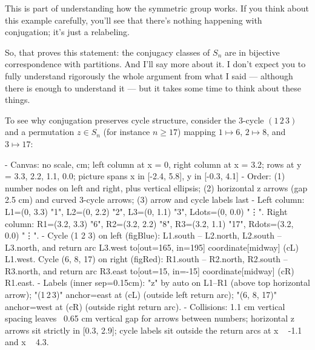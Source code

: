 \begin{speech}[01:21:37 - 01:23:51]
This is part of understanding how the symmetric group works. If you think about this example carefully, you'll see that there's nothing happening with conjugation; it's just a relabeling.

So, that proves this statement: the conjugacy classes of $S_n$ are in bijective correspondence with partitions. And I'll say more about it. I don't expect you to fully understand rigorously the whole argument from what I said --- although there is enough to understand it --- but it takes some time to think about these things.
\end{speech}

\begin{content}
To see why conjugation preserves cycle structure, consider the $3$-cycle $(1\,2\,3)$ and a permutation $z \in S_n$ (for instance $n \ge 17$) mapping $1 \mapsto 6$, $2 \mapsto 8$, and $3 \mapsto 17$:

\begin{hidden}
- Canvas: no scale, cm; left column at x = 0, right column at x = 3.2; rows at y = 3.3, 2.2, 1.1, 0.0; picture spans x in [-2.4, 5.8], y in [-0.3, 4.1]
- Order: (1) number nodes on left and right, plus vertical ellipsis; (2) horizontal z arrows (gap 2.5 cm) and curved 3-cycle arrows; (3) arrow and cycle labels last
- Left column: L1=(0, 3.3) "1", L2=(0, 2.2) "2", L3=(0, 1.1) "3", Ldots=(0, 0.0) "\vdots".
  Right column: R1=(3.2, 3.3) "6", R2=(3.2, 2.2) "8", R3=(3.2, 1.1) "17", Rdots=(3.2, 0.0) "\vdots".
- Cycle (1 2 3) on left (figBlue): L1.south -- L2.north, L2.south -- L3.north, and return arc L3.west to[out=165, in=195] coordinate[midway] (cL) L1.west.
  Cycle (6, 8, 17) on right (figRed): R1.south -- R2.north, R2.south -- R3.north, and return arc R3.east to[out=15, in=-15] coordinate[midway] (cR) R1.east.
- Labels (inner sep=0.15cm):
  "z" by auto on L1--R1 (above top horizontal arrow);
  "(1\,2\,3)" anchor=east at (cL) (outside left return arc);
  "(6, 8, 17)" anchor=west at (cR) (outside right return arc).
- Collisions: 1.1 cm vertical spacing leaves ~0.65 cm vertical gap for arrows between numbers; horizontal z arrows sit strictly in [0.3, 2.9]; cycle labels sit outside the return arcs at x ~ -1.1 and x ~ 4.3.
\end{hidden}
\begin{center}
\end{center}
\end{content}
